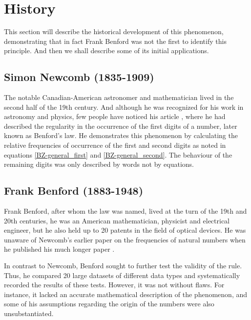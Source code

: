 \section{History}

This section will describe the historical development of this phenomenon, demonstrating that in fact Frank Benford was not the first to identify this principle. And then we shall describe some of its initial applications. \cite{kossovsky2014benford,Hronova2023}

\subsection{Simon Newcomb (1835-1909)}

The notable Canadian-American astronomer and mathematician lived in the second half of the 19th century. And although he was recognized for his work in astronomy and physics, few people have noticed his article \emph{}, where he had described the regularity in the occurrence of the first digits of a number, later known as Benford's law. He demonstrates this phenomenon by calculating the relative frequencies of occurrence of the first and second digits as noted in equations \ref{BZ-general_first} and \ref{BZ-general_second}. The behaviour of the remaining digits was only described by words not by equations. \cite{kossovsky2014benford, Newcomb1881, Hronova2023}  

\subsection{Frank Benford (1883-1948)}

Frank Benford, after whom the law was named, lived at the turn of the 19th and 20th centuries, he was an American mathematician, physicist and electrical engineer, but he also held up to 20 patents in the field of optical devices. He was unaware of Newcomb's earlier paper on the frequencies of natural numbers when he published his much longer paper \emph{}. \cite{kossovsky2014benford, Hronova2023}

In contrast to Newcomb, Benford sought to further test the validity of the rule. Thus, he compared 20 large datasets of different data types and systematically recorded the results of these tests. However, it was not without flaws. For instance, it lacked an accurate mathematical description of the phenomenon, and some of his assumptions regarding the origin of the numbers were also unsubstantiated. \cite{kossovsky2014benford, Hronova2023}

